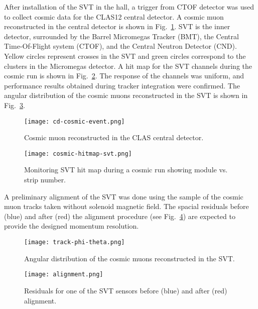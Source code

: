 After installation of the SVT in the hall, a trigger from CTOF detector was used to collect cosmic data for the CLAS12 central detector. A cosmic muon reconstructed in the central detector is shown in Fig.~\ref{fig:cd-cosmic-event}. SVT is the inner detector, surrounded by the Barrel Micromegas Tracker (BMT), the Central Time-Of-Flight system (CTOF), and the Central Neutron Detector (CND). Yellow circles represent crosses in the SVT and green circles correspond to the clusters in the Micromegas detector. A hit map for the SVT channels during the cosmic run is shown in Fig.~\ref{fig:cosmic-hitmap-svt}. The response of the channels was uniform, and performance results obtained during tracker integration were confirmed.
The angular distribution of the cosmic muons reconstructed in the SVT is shown in Fig.~\ref{fig:track-phi-theta}.

\begin{figure}[hbt] 
\centering 
\texttt{[image: cd-cosmic-event.png]}
\caption{Cosmic muon reconstructed in the CLAS central detector.}
\label{fig:cd-cosmic-event}
\end{figure}

\begin{figure}[hbt] 
\centering 
\texttt{[image: cosmic-hitmap-svt.png]}
\caption{Monitoring SVT hit map during a cosmic run showing module vs. strip number.}
\label{fig:cosmic-hitmap-svt}
\end{figure}

A preliminary alignment of the SVT was done using the sample of the cosmic muon tracks taken without solenoid magnetic field. The spacial residuals before (blue) and after (red) the alignment procedure (see Fig.~\ref{fig:alignment}) are expected to provide the designed momentum resolution.

\begin{figure}[hbt] 
\centering 
\texttt{[image: track-phi-theta.png]}
\caption{Angular distribution of the cosmic muons reconstructed in the SVT.}
\label{fig:track-phi-theta}
\end{figure}

\begin{figure}[hbt] 
\centering 
\texttt{[image: alignment.png]}
\caption{Residuals for one of the SVT sensors before (blue) and after (red) alignment.}
\label{fig:alignment}
\end{figure}

